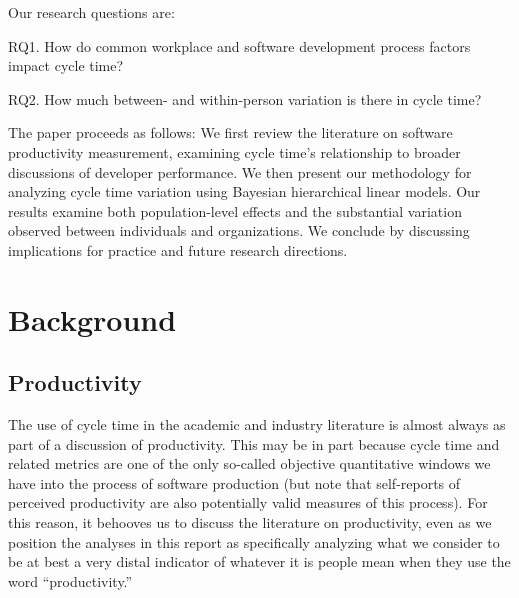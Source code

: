 \documentclass[
]{article}
\begin{document}
Our research questions are:

RQ1. How do common workplace and software development process factors
impact cycle time?

RQ2. How much between- and within-person variation is there in cycle
time?

The paper proceeds as follows: We first review the literature on
software productivity measurement, examining cycle time's relationship
to broader discussions of developer performance. We then present our
methodology for analyzing cycle time variation using Bayesian
hierarchical linear models. Our results examine both population-level
effects and the substantial variation observed between individuals and
organizations. We conclude by discussing implications for practice and
future research directions.

\section{Background}\label{background}

\subsection{Productivity}\label{productivity}

The use of cycle time in the academic and industry literature is almost
always as part of a discussion of productivity. This may be in part
because cycle time and related metrics are one of the only so-called
objective quantitative windows we have into the process of software
production (but note that self-reports of perceived productivity are
also potentially valid measures of this process). For this reason, it
behooves us to discuss the literature on productivity, even as we
position the analyses in this report as specifically analyzing what we
consider to be at best a very distal indicator of whatever it is people
mean when they use the word ``productivity.''
\end{document}
